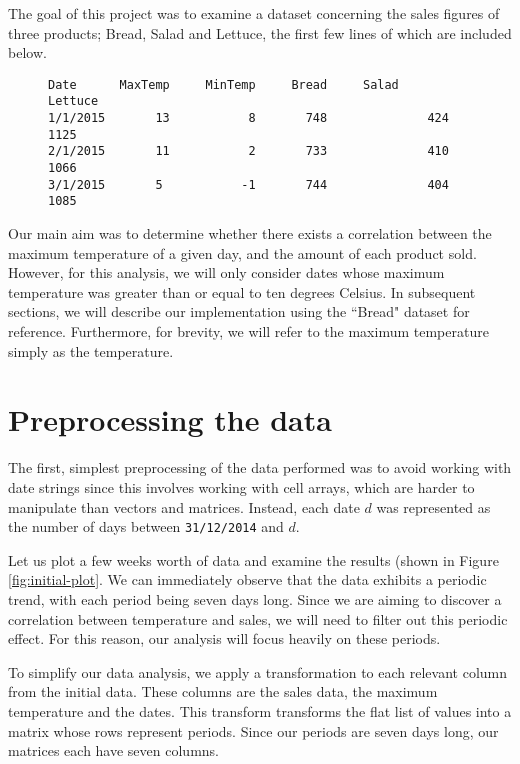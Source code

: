 The goal of this project was to examine a dataset concerning the sales figures of three products; Bread, Salad and Lettuce, the first few lines of which are included below.

\begin{figure}[h!]
\centering
\begin{verbatim}
Date      MaxTemp     MinTemp     Bread     Salad     Lettuce
1/1/2015       13           8       748              424               1125
2/1/2015       11           2       733              410               1066
3/1/2015       5           -1       744              404               1085
\end{verbatim}
\end{figure}

Our main aim was to determine whether there exists a correlation between the maximum temperature of a given day, and the amount of each product sold. However, for this analysis, we will only consider dates whose maximum temperature was greater than or equal to ten degrees Celsius. In subsequent sections, we will describe our implementation using the ``Bread" dataset for reference. Furthermore, for brevity, we will refer to the maximum temperature simply as the temperature.

\section{Preprocessing the data}\label{sec:preprocess}

The first, simplest preprocessing of the data performed was to avoid working with date strings since this involves working with cell arrays, which are harder to manipulate than vectors and matrices. Instead, each date $d$ was represented as the number of days between \texttt{31/12/2014} and $d$.

Let us plot a few weeks worth of data and examine the results (shown in Figure \ref{fig:initial-plot}. We can immediately observe that the data exhibits a periodic trend, with each period being seven days long. Since we are aiming to discover a correlation between temperature and sales, we will need to filter out this periodic effect. For this reason, our analysis will focus heavily on these periods.


To simplify our data analysis, we apply a transformation to each relevant column from the initial data. These columns are the sales data, the maximum temperature and the dates. This transform transforms the flat list of values into a matrix whose rows represent periods. Since our periods are seven days long, our matrices each have seven columns.

